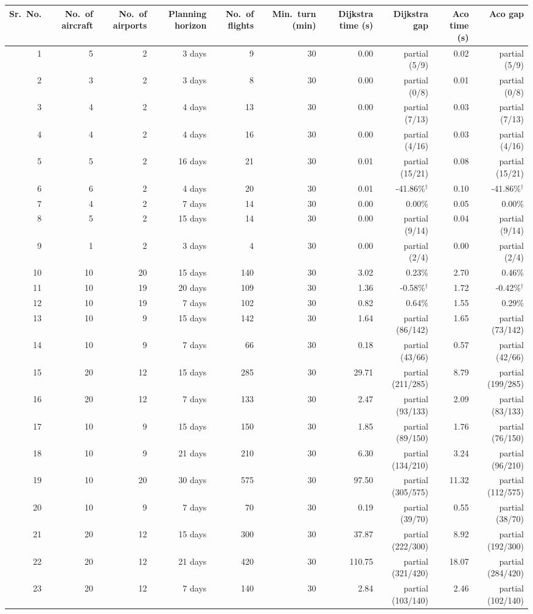 \begin{tabular}{rrrrrrrrrr}
\toprule
Sr.\ No. & No.\ of aircraft & No.\ of airports & Planning horizon & No.\ of flights & Min.\ turn (min) & Dijkstra time (s) & Dijkstra gap & Aco time (s) & Aco gap \\
\midrule
1 & 5 & 2 & 3 days & 9 & 30 & 0.00 & partial (5/9) & 0.02 & partial (5/9) \\
2 & 3 & 2 & 3 days & 8 & 30 & 0.00 & partial (0/8) & 0.01 & partial (0/8) \\
3 & 4 & 2 & 4 days & 13 & 30 & 0.00 & partial (7/13) & 0.03 & partial (7/13) \\
4 & 4 & 2 & 4 days & 16 & 30 & 0.00 & partial (4/16) & 0.03 & partial (4/16) \\
5 & 5 & 2 & 16 days & 21 & 30 & 0.01 & partial (15/21) & 0.08 & partial (15/21) \\
6 & 6 & 2 & 4 days & 20 & 30 & 0.01 & -41.86\%$^{\dagger}$ & 0.10 & -41.86\%$^{\dagger}$ \\
7 & 4 & 2 & 7 days & 14 & 30 & 0.00 & 0.00\% & 0.05 & 0.00\% \\
8 & 5 & 2 & 15 days & 14 & 30 & 0.00 & partial (9/14) & 0.04 & partial (9/14) \\
9 & 1 & 2 & 3 days & 4 & 30 & 0.00 & partial (2/4) & 0.00 & partial (2/4) \\
10 & 10 & 20 & 15 days & 140 & 30 & 3.02 & 0.23\% & 2.70 & 0.46\% \\
11 & 10 & 19 & 20 days & 109 & 30 & 1.36 & -0.58\%$^{\dagger}$ & 1.72 & -0.42\%$^{\dagger}$ \\
12 & 10 & 19 & 7 days & 102 & 30 & 0.82 & 0.64\% & 1.55 & 0.29\% \\
13 & 10 & 9 & 15 days & 142 & 30 & 1.64 & partial (86/142) & 1.65 & partial (73/142) \\
14 & 10 & 9 & 7 days & 66 & 30 & 0.18 & partial (43/66) & 0.57 & partial (42/66) \\
15 & 20 & 12 & 15 days & 285 & 30 & 29.71 & partial (211/285) & 8.79 & partial (199/285) \\
16 & 20 & 12 & 7 days & 133 & 30 & 2.47 & partial (93/133) & 2.09 & partial (83/133) \\
17 & 10 & 9 & 15 days & 150 & 30 & 1.85 & partial (89/150) & 1.76 & partial (76/150) \\
18 & 10 & 9 & 21 days & 210 & 30 & 6.30 & partial (134/210) & 3.24 & partial (96/210) \\
19 & 10 & 20 & 30 days & 575 & 30 & 97.50 & partial (305/575) & 11.32 & partial (112/575) \\
20 & 10 & 9 & 7 days & 70 & 30 & 0.19 & partial (39/70) & 0.55 & partial (38/70) \\
21 & 20 & 12 & 15 days & 300 & 30 & 37.87 & partial (222/300) & 8.92 & partial (192/300) \\
22 & 20 & 12 & 21 days & 420 & 30 & 110.75 & partial (321/420) & 18.07 & partial (284/420) \\
23 & 20 & 12 & 7 days & 140 & 30 & 2.84 & partial (103/140) & 2.46 & partial (102/140) \\
\bottomrule
\end{tabular}

